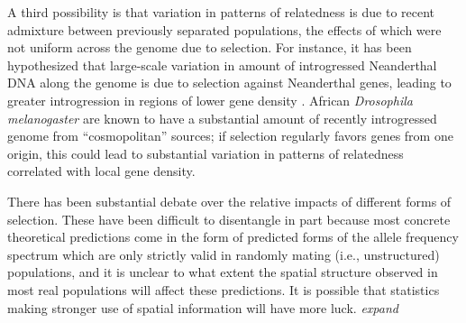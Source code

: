 \documentclass[11pt, oneside]{article}   	%
\newcommand{\plr}[1]{{\em \color{blue} #1}}
\begin{document}
A third possibility is that variation in patterns of relatedness is due to recent admixture between previously separated populations,
the effects of which were not uniform across the genome due to selection.
For instance, it has been hypothesized that large-scale variation in amount of introgressed Neanderthal DNA along the genome
is due to selection against Neanderthal genes, leading to greater introgression in regions of lower gene density
\citep{harris2016genetic,juric2016strength}.
African \textit{Drosophila melanogaster} are known to have a substantial amount of recently introgressed genome from ``cosmopolitan'' sources;
if selection regularly favors genes from one origin,
this could lead to substantial variation in patterns of relatedness correlated with local gene density.

There has been substantial debate over the relative impacts of different forms of selection.
These have been difficult to disentangle in part because most concrete theoretical predictions
come in the form of predicted forms of the allele frequency spectrum which are only strictly valid in randomly mating (i.e., unstructured) populations,
and it is unclear to what extent the spatial structure observed in most real populations will affect these predictions.
It is possible that statistics making stronger use of spatial information
will have more luck.
\plr{expand}
\end{document}
